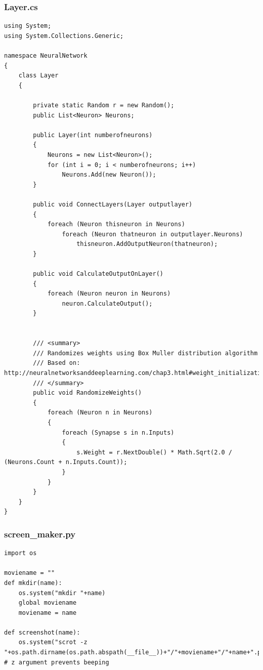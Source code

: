 \documentclass[12pt,a4paper]{article}
\begin{document}
\subsubsection*{Layer.cs}
\begin{lstlisting}
using System;
using System.Collections.Generic;

namespace NeuralNetwork
{
    class Layer
    {

        private static Random r = new Random();
        public List<Neuron> Neurons;

        public Layer(int numberofneurons)
        {
            Neurons = new List<Neuron>();
            for (int i = 0; i < numberofneurons; i++)
                Neurons.Add(new Neuron());
        }

        public void ConnectLayers(Layer outputlayer)
        {
            foreach (Neuron thisneuron in Neurons)
                foreach (Neuron thatneuron in outputlayer.Neurons)
                    thisneuron.AddOutputNeuron(thatneuron);
        }

        public void CalculateOutputOnLayer()
        {
            foreach (Neuron neuron in Neurons)
                neuron.CalculateOutput();
        }


        /// <summary>
        /// Randomizes weights using Box Muller distribution algorithm
        /// Based on: http://neuralnetworksanddeeplearning.com/chap3.html#weight_initialization
        /// </summary>
        public void RandomizeWeights()
        {
            foreach (Neuron n in Neurons)
            {
                foreach (Synapse s in n.Inputs)
                {
                    s.Weight = r.NextDouble() * Math.Sqrt(2.0 / (Neurons.Count + n.Inputs.Count));
                }
            }
        }
    }
}\end{lstlisting}
\pagebreak


\subsubsection*{screen\_maker.py}
\begin{lstlisting}
import os

moviename = ""
def mkdir(name):
    os.system("mkdir "+name)
    global moviename
    moviename = name

def screenshot(name):
    os.system("scrot -z "+os.path.dirname(os.path.abspath(__file__))+"/"+moviename+"/"+name+".png") # z argument prevents beeping\end{lstlisting}
\pagebreak
\end{document}

